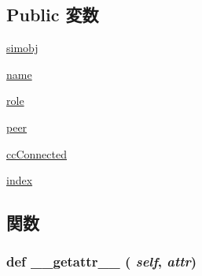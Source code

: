 \subsection*{Public 変数}
\begin{DoxyCompactItemize}
\item 
\hyperlink{classm5_1_1params_1_1PortRef_a5fccb54db416603de9f73682d34ea092}{simobj}
\item 
\hyperlink{classm5_1_1params_1_1PortRef_ab74e6bf80237ddc4109968cedc58c151}{name}
\item 
\hyperlink{classm5_1_1params_1_1PortRef_a4e0cdb878325d53ad79a74504bf97a96}{role}
\item 
\hyperlink{classm5_1_1params_1_1PortRef_a3c494215e4790a80ee48db4c305b387b}{peer}
\item 
\hyperlink{classm5_1_1params_1_1PortRef_acc170d29b85660fe80665f04ce53bbe3}{ccConnected}
\item 
\hyperlink{classm5_1_1params_1_1PortRef_a6784e1c334dfceb8f017667c0b0f6a3e}{index}
\end{DoxyCompactItemize}


\subsection{関数}
\hypertarget{classm5_1_1params_1_1PortRef_a0a990b3ec3889d40889daca9ee5e4695}{
\subsubsection[{\_\-\_\-getattr\_\-\_\-}]{\setlength{\rightskip}{0pt plus 5cm}def \_\-\_\-getattr\_\-\_\- ( {\em self}, \/   {\em attr})}}
\label{classm5_1_1params_1_1PortRef_a0a990b3ec3889d40889daca9ee5e4695}



